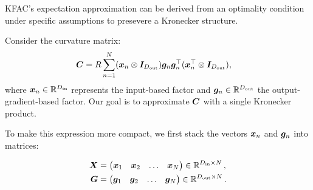 \begin{example}
  \label{ex:just_kfac_exp_approx}
  KFAC's expectation approximation can be derived from an optimality condition under specific assumptions to presevere a Kronecker structure.

  Consider the curvature matrix:
  \begin{align*}
    {\bm{C}}
    &=
      R \sum_{n=1}^N
      ({\bm{x}}_n \otimes {\bm{I}}_{D_{\text{out}}})
      {\bm{g}}_n {\bm{g}}_n^{\top}
      ({\bm{x}}_n^{\top} \otimes {\bm{I}}_{D_{\text{out}}}),
  \end{align*}
  where ${\bm{x}}_n \in {\mathbb{R}}^{D_{\text{in}}}$ represents the input-based factor and ${\bm{g}}_n \in {\mathbb{R}}^{D_{\text{out}}}$ the output-gradient-based factor. Our goal is to approximate ${\bm{C}}$ with a single Kronecker product.

  To make this expression more compact, we first stack the vectors ${\bm{x}}_n$ and ${\bm{g}}_n$ into matrices:

  \begin{align*}
    {\bm{X}}
    &=
      \begin{pmatrix}
        {\bm{x}}_1 & {\bm{x}}_2 & \ldots & {\bm{x}}_N
      \end{pmatrix}
      \in {\mathbb{R}}^{D_{\text{in}} \times N}\,,
    \\
    {\bm{G}}
    &=
      \begin{pmatrix}
        {\bm{g}}_1 & {\bm{g}}_2 & \ldots & {\bm{g}}_N
      \end{pmatrix}
      \in {\mathbb{R}}^{D_{\text{out}} \times N}\,.
  \end{align*}


\end{example}
